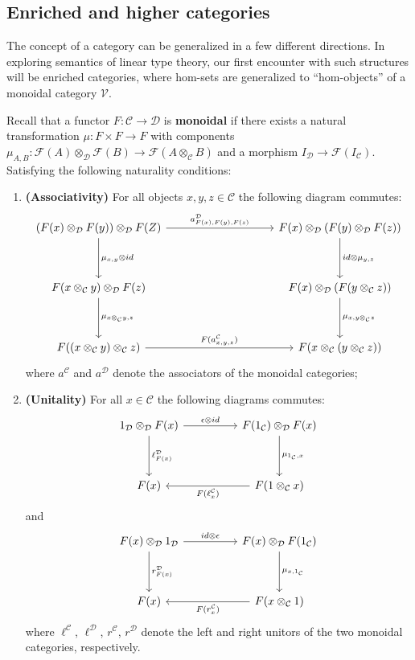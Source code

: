 \subsection{Enriched and higher categories}
The concept of a category can be generalized in a few different directions. In exploring semantics of linear type theory, our first encounter with such structures will be  enriched categories, where hom-sets are generalized to ``hom-objects'' of a monoidal category $\mathcal{V}$.
\begin{defn}Recall that a functor $F : \mathcal{C} \to \mathcal{D}$ is \textbf{monoidal} if there exists a natural transformation $\mu : F \times F \to F$ with components $\mu_{A,B} : \mathcal{F}(A) \otimes_{\mathcal{D}} \mathcal{F}(B) \to \mathcal{F}(A \otimes_{\mathcal{C}} B)$ and a morphism $I_{\mathcal{D}} \to \mathcal{F}(I_{\mathcal{C}})$. Satisfying the following naturality conditions:\\
\begin{enumerate}%
\item \textbf{(Associativity)} For all objects $x,y,z \in \mathcal{C}$ the following diagram commutes:
  \[
    \ti
    (F(x) \otimes_{\mathcal{D}} F(y)) \otimes_{\mathcal{D}} F(Z)
    \ar[rr,"{a^{\mathcal{D}}_{F(x),F(y),F(z)}}"]
    \ar[d, "{\mu_{x,y} \otimes id}"] & &
    F(x) \otimes_{\mathcal{D}}( F(y)\otimes_{\mathcal{D}} F(z) )
    \ar[d, "{id\otimes \mu_{y,z}}"]\\
    F(x \otimes_{\mathcal{C}} y) \otimes_{\mathcal{D}} F(z)
    \ar[d, "{\mu_{x \otimes_{\mathcal{C}} y , z} }"]
     &&
     F(x) \otimes_{\mathcal{D}} ( F(y \otimes_{\mathcal{C}} z) )
     \ar[d, "\mu_{ x, y \otimes_{\mathcal{C}} z  }"]
     \\
     F( ( x \otimes_{\mathcal{C}} y ) \otimes_{\mathcal{C}} z  )
     \ar[rr, "F(a^{\mathcal{C}}_{x,y,z})"]&&
    F( x \otimes_{\mathcal{C}} ( y \otimes_{\mathcal{C}} z ) )
    \kz
\]
where $a^{\mathcal{C}}$ and $a^{\mathcal{D}}$ denote the associators of the monoidal categories;
\item \textbf{(Unitality)} For all $x \in \mathcal{C}$ the following diagrams commutes:
  \[
    \ti
    1_{\mathcal{D}} \otimes_{\mathcal{D}} F(x)
    \ar[r, "\epsilon \otimes id"]
    \ar[d, "\ell^{\mathcal{D}}_{F(x)}"]
      &
      F(1_{\mathcal{C}}) \otimes_{\mathcal{D}} F(x)
      \ar[d, "\mu_{1_{\mathcal{C}}, x }"]
      \\
      F(x) &
      \ar[l, "F(\ell^{\mathcal{C}}_x)"]
      F( 1 \otimes_{\mathcal{C}} x)
      \kz
\]
and
  \[
    \ti
     F(x) \otimes_{\mathcal{D}} 1_{\mathcal{D}} 
    \ar[r, "id \otimes \epsilon"]
    \ar[d, "r^{\mathcal{D}}_{F(x)}"]
      &
      F(x) \otimes_{\mathcal{D}}F(1_{\mathcal{C}}) 
      \ar[d, "\mu_{x, 1_{\mathcal{C}}}"]
      \\
      F(x) &
      \ar[l, "F(r^{\mathcal{C}}_x)"]
      F( x \otimes_{\mathcal{C}} 1)
      \kz
\]
where $\ell^{\mathcal{C}}$, $\ell^{\mathcal{D}}$, $r^{\mathcal{C}}$, $r^{\mathcal{D}}$ denote the left and right unitors of the two monoidal categories, respectively.
\end{enumerate}
\end{defn}
